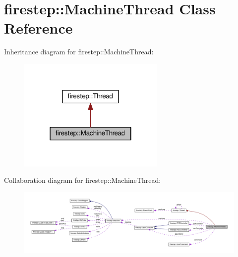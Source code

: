 \hypertarget{classfirestep_1_1_machine_thread}{\section{firestep\+:\+:Machine\+Thread Class Reference}
\label{classfirestep_1_1_machine_thread}
}


Inheritance diagram for firestep\+:\+:Machine\+Thread\+:\nopagebreak
\begin{figure}[H]
\begin{center}
\leavevmode
\includegraphics[width=202pt]{classfirestep_1_1_machine_thread__inherit__graph}
\end{center}
\end{figure}


Collaboration diagram for firestep\+:\+:Machine\+Thread\+:
\nopagebreak
\begin{figure}[H]
\begin{center}
\leavevmode
\includegraphics[width=350pt]{classfirestep_1_1_machine_thread__coll__graph}
\end{center}
\end{figure}
